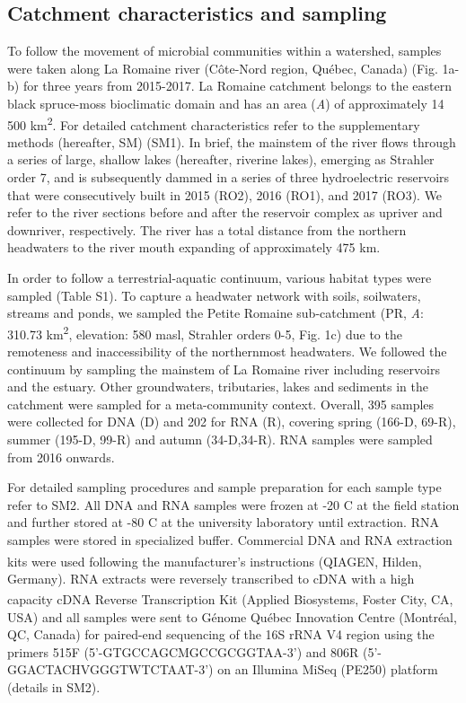 \documentclass[12pt,a4paper]{article} %
\begin{document}
\subsection*{Catchment characteristics and sampling}
To follow the movement of microbial communities within a watershed, samples were taken along La Romaine river (C\^{o}te-Nord region, Qu\'{e}bec, Canada) (Fig. 1a-b) for three years from 2015-2017. La Romaine catchment belongs to the eastern black spruce-moss bioclimatic domain and has an area (\textit{A}) of approximately 14 500 km\textsuperscript{2}. For detailed catchment characteristics refer to the supplementary methods (hereafter, SM) (SM1). In brief, the mainstem of the river flows through a series of large, shallow lakes (hereafter, riverine lakes), emerging as Strahler order 7, and is subsequently dammed in a series of three hydroelectric reservoirs that were consecutively built in 2015 (RO2), 2016 (RO1), and 2017 (RO3). We refer to the river sections before and after the reservoir complex as upriver and downriver, respectively. The river has a total distance from the northern headwaters to the river mouth expanding of approximately 475 km.

In order to follow a terrestrial-aquatic continuum, various habitat types were sampled (Table S1). To capture a headwater network with soils, soilwaters, streams and ponds, we sampled the Petite Romaine sub-catchment (PR, \textit{A}: 310.73 km\textsuperscript{2}, elevation: 580 masl, Strahler orders 0-5, Fig. 1c) due to the remoteness and inaccessibility of the northernmost headwaters. We followed the continuum by sampling the mainstem of La Romaine river including reservoirs and the estuary. Other groundwaters, tributaries, lakes and sediments in the catchment were sampled for a meta-community context. Overall, 395 samples were collected for DNA (D) and 202 for RNA (R), covering spring (166-D, 69-R), summer (195-D, 99-R) and autumn (34-D,34-R). RNA samples were sampled from 2016 onwards.

For detailed sampling procedures and sample preparation for each sample type refer to SM2. All DNA and RNA samples were frozen at -20 \textdegree{}C at the field station and further stored at -80 \textdegree{}C at the university laboratory until extraction. RNA samples were stored in specialized buffer. Commercial DNA and RNA extraction kits were used following the manufacturer's instructions (QIAGEN\textsuperscript{\textregistered}, Hilden, Germany). RNA extracts were reversely transcribed to cDNA with a high capacity cDNA Reverse Transcription Kit (Applied Biosystems\textsuperscript{\texttrademark}, Foster City, CA, USA) and all samples were sent to G\'{e}nome Qu\'{e}bec Innovation Centre (Montr\'{e}al, QC, Canada) for paired-end sequencing of the 16S rRNA V4 region using the primers 515F (5'-GTGCCAGCMGCCGCGGTAA-3') and 806R (5'-GGACTACHVGGGTWTCTAAT-3') on an Illumina MiSeq (PE250) platform (details in SM2).
\end{document}
